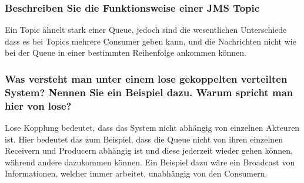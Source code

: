 \subsubsection{Beschreiben Sie die Funktionsweise einer JMS Topic}

Ein Topic ähnelt stark einer Queue, jedoch sind die wesentlichen Unterschiede dass es bei Topics mehrere Consumer geben kann, und die Nachrichten nicht wie bei der Queue in einer bestimmten Reihenfolge ankommen können.

\subsubsection{Was versteht man unter einem lose gekoppelten verteilten System? Nennen Sie ein Beispiel dazu. Warum spricht man hier von lose?}

Lose Kopplung bedeutet, dass das System nicht abhängig von einzelnen Akteuren ist. Hier bedeutet das zum Beispiel, dass die Queue nicht von ihren einzelnen Receivern und Producern abhängig ist und diese jederzeit wieder gehen können, während andere dazukommen können.
Ein Beispiel dazu wäre ein Broadcast von Informationen, welcher immer arbeitet, unabhängig von den Consumern.
